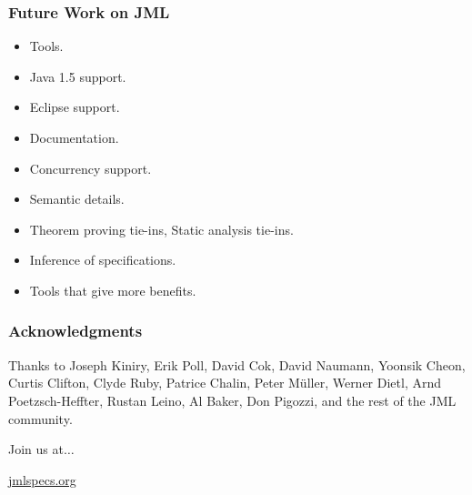 \begin{frame}
\frametitle{Future Work on JML}
\begin{itemize}
\item
Tools.

\item
Java 1.5 support.

\item
Eclipse support.

\item
Documentation.

\item
Concurrency support.

\item
Semantic details.

\item
Theorem proving tie-ins, Static analysis tie-ins.

\item
Inference of specifications.

\item
Tools that give more benefits.
\end{itemize}
\end{frame}

\begin{frame}
\frametitle{Acknowledgments}
Thanks to Joseph Kiniry, Erik Poll, David Cok, David Naumann, 
Yoonsik Cheon, Curtis Clifton, Clyde Ruby, Patrice Chalin,
Peter M\"{u}ller, Werner Dietl,
Arnd Poetzsch-Heffter,
Rustan Leino, 
Al Baker, Don Pigozzi,
and
the rest of the JML community.

Join us at$\ldots$

\begin{center}
\href{http://www.jmlspecs.org/}{jmlspecs.org}
\end{center}
\end{frame}




